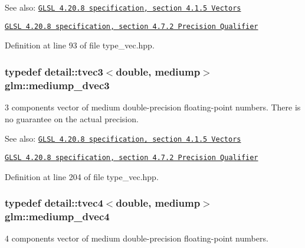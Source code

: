 \begin{Desc}
\item[See also:]\href{http://www.opengl.org/registry/doc/GLSLangSpec.4.20.8.pdf}{\tt GLSL 4.20.8 specification, section 4.1.5 Vectors} 

\href{http://www.opengl.org/registry/doc/GLSLangSpec.4.20.8.pdf}{\tt GLSL 4.20.8 specification, section 4.7.2 Precision Qualifier} \end{Desc}


Definition at line 93 of file type\_\-vec.hpp.\hypertarget{group__core__precision_gc051f0702cb0e717db5dd913f6261388}{
\subsubsection[mediump\_\-dvec3]{\setlength{\rightskip}{0pt plus 5cm}typedef detail::tvec3$<$double, mediump$>$ {\bf glm::mediump\_\-dvec3}}}
\label{group__core__precision_gc051f0702cb0e717db5dd913f6261388}


3 components vector of medium double-precision floating-point numbers. There is no guarantee on the actual precision.

\begin{Desc}
\item[See also:]\href{http://www.opengl.org/registry/doc/GLSLangSpec.4.20.8.pdf}{\tt GLSL 4.20.8 specification, section 4.1.5 Vectors} 

\href{http://www.opengl.org/registry/doc/GLSLangSpec.4.20.8.pdf}{\tt GLSL 4.20.8 specification, section 4.7.2 Precision Qualifier} \end{Desc}


Definition at line 204 of file type\_\-vec.hpp.\hypertarget{group__core__precision_gc61cf2fc2df895e5f277c978dace042a}{
\subsubsection[mediump\_\-dvec4]{\setlength{\rightskip}{0pt plus 5cm}typedef detail::tvec4$<$double, mediump$>$ {\bf glm::mediump\_\-dvec4}}}
\label{group__core__precision_gc61cf2fc2df895e5f277c978dace042a}


4 components vector of medium double-precision floating-point numbers.

